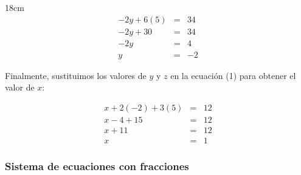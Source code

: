 {\begin{solutionbox}{18cm}
            \begin{eqnarray}
                -2y + 6(5) & = & 34 \nonumber\\
                -2y + 30 & = & 34 \nonumber\\
                -2y & = & 4 \nonumber\\
                y & = & -2 \nonumber
            \end{eqnarray}

            Finalmente, sustituimos los valores de $y$ y $z$ en la ecuación (1) para obtener el valor de $x$:

            \begin{eqnarray}
                x + 2(-2) + 3(5) & = & 12 \nonumber\\
                x - 4 + 15 & = & 12 \nonumber\\
                x + 11 & = & 12 \nonumber\\
                x & = & 1 \nonumber
            \end{eqnarray}
        \end{solutionbox}
    }

    \subsubsection{Sistema de ecuaciones con fracciones}
  

